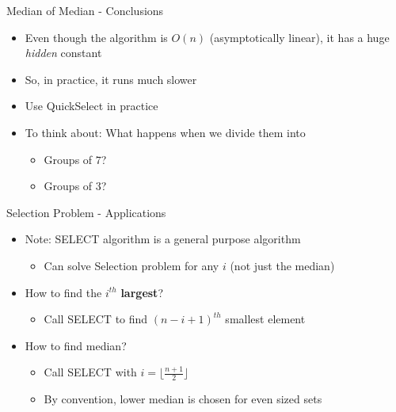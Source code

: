 \documentclass{beamer}
\begin{document}
\begin{frame}{Median of Median - Conclusions}
\begin{itemize}
    \item Even though the algorithm is $O(n)$ (asymptotically linear), it has a huge {\em hidden} constant
    \item So, in practice, it runs much slower
    \item Use QuickSelect in practice
    \item To think about: What happens when we divide them into 
    \begin{itemize}
        \item Groups of $7$?
        \item Groups of $3$?
    \end{itemize}
\end{itemize}
\end{frame}



\begin{frame}{Selection Problem - Applications}
\begin{itemize}
    \item  Note: SELECT algorithm is a general purpose algorithm 
    \begin{itemize}
        \item Can solve Selection problem for any $i$ (not just the median)
    \end{itemize}
    \item How to find the $i^{th}$ {\bf largest}? \pause
    \begin{itemize}
        \item Call SELECT to find $(n-i+1)^{th}$ smallest element
    \end{itemize}
    \item How to find median? \pause
    \begin{itemize}
        \item Call SELECT with $i=\lfloor \frac{n+1}{2} \rfloor$
        \item By convention, lower median is chosen for even sized sets 
    \end{itemize}
\end{itemize}
\end{frame}
\end{document}
